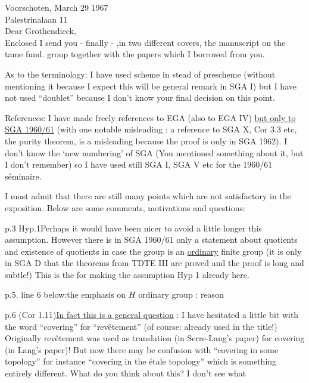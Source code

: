 Voorschoten, March 29 1967\\
Palestrinalaan 11\\

Dear Grothendieck,\\

Enclosed I send you - finally - ,in two different covers, the manuscript on the tame fund. group together with the papers which I borrowed from you.

As to the terminology: I have used scheme in stead of prescheme (without mentioning it because I expect this will be  general remark in SGA I) but I have not used ``doublet'' because I don't know your final decision on this point.

References: I have made freely references to EGA (also to EGA IV) \uline{but only to SGA 1960/61} (with one notable misleading : a reference to SGA X, Cor 3.3 etc, the purity theorem, is a misleading because the proof is only in SGA 1962). I don't know the `new numbering' of SGA (You mentioned something about it, but I don't remember) so I have used still SGA I, SGA V etc for the 1960/61 séminaire.

I must admit that there are still many points which are not satisfactory in the exposition. Below are some comments, motivations and questions:

p.3 Hyp.1\quad Perhaps it would have been nicer to avoid a little longer this assumption. However there is in SGA 1960/61 only a statement about quotients and existence of quotients in case the group is an \uline{ordinary} finite group (it is only in SGA D that the theorems from TDTE III are proved and the proof is long and subtle!) This is the  for making the assumption Hyp 1 already here.

p.5. line 6 below:\quad the emphasis on $H$ ordinary group :  reason

p.6 (Cor 1.11)\quad \uline{In fact this is a general question} : I have hesitated a little bit with the word ``covering'' for ``revêtement'' (of course: already used in the title!) Originally revêtement was used as translation  (in Serre-Lang's paper) for covering (in Lang's paper)! But now there may be confusion with ``covering in some topology'' for instance ``covering in the étale topology'' which is something entirely different. What do you think about this? I don't see what
